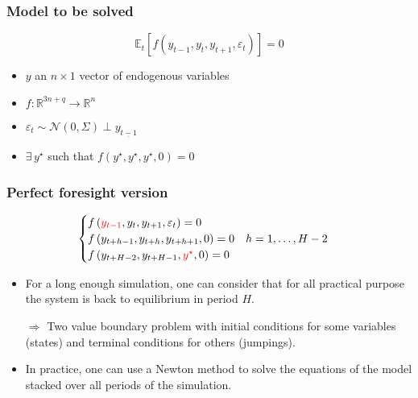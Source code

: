 \documentclass{beamer}
\begin{document}
\begin{frame}
\frametitle{Model to be solved}

\[
\mathbb E_t\left[ f\left( y_{t-1},y_t,y_{t+1},\varepsilon_t \right) \right] = 0
\]

\bigskip

\begin{itemize}

\item $y$ an $n\times 1$ vector of endogenous variables\newline

\item $f: \mathbb R^{3n+q}\rightarrow \mathbb R^n$\newline

\item $\varepsilon_t \sim \mathcal N\left( 0,\Sigma \right) \perp y_{\underline{t-1}}$\newline

\item $ \exists\, y^{\star}$ such that $f\left( y^{\star},y^{\star},y^{\star},0 \right)=0$

\end{itemize}

\end{frame}


\begin{frame}
  \frametitle{Perfect foresight version}

  \[
    \begin{cases}
      f\left( {\color{red}y_{t-1}},y_t,y_{t+1},\varepsilon_t \right) = 0\\
      f\left( y_{t+h-1},y_{t+h},y_{t+h+1}, 0 \right) = 0\quad h=1,\ldots,H-2\\
      f\left( y_{t+H-2},y_{t+H-1},{\color{red}y^{\star}}, 0 \right) = 0\\
    \end{cases}
  \]
  \bigskip

  \begin{itemize}

  \item For a long enough simulation, one can consider that for all
    practical purpose the system is back to equilibrium in period $H$.\newline

  \item[$\Rightarrow$] Two value boundary problem with
    initial conditions for some variables (states) and
    terminal conditions for others (jumpings).\newline

  \item In practice, one can use a Newton method to solve the equations of
    the model stacked over all periods of the simulation.\newline

  \end{itemize}

\end{frame}
\end{document}
